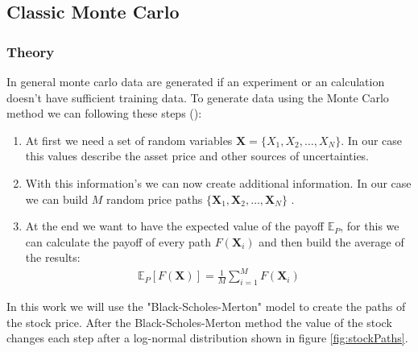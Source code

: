 \subsection{Classic Monte Carlo}
\subsubsection{Theory} \label{sec:classic_mc_theory}
In general monte carlo data are generated if an experiment or an calculation doesn't have sufficient training data. To generate data using the Monte Carlo method we can following these steps (\cite{1905.02666}):
\begin{enumerate}
	\item At first we need a set of random variables $\textbf{X}=\{X_1, X_2, \dots, X_N\}$. In our case this values describe the asset price and other sources of uncertainties.
	\item With this information's we can now create additional information. In our case we can build $M$ random price paths $\{ \textbf{X}_1, \textbf{X}_2, \dots, \textbf{X}_N \}$ .
	\item At the end we want to have the expected value of the payoff $\mathbb{E}_P$, for this we can calculate the payoff of every path $F(\textbf{X}_i)$ and then build the average of the results:
	    \begin{align}
	        \mathbb{E}_P[F(\textbf{X})] = \frac{1}{M} \sum_{i=1}^{M} F(\textbf{X}_i)
	    \end{align}
\end{enumerate}

In this work we will use the "Black-Scholes-Merton" model to create the paths of the stock price. After the Black-Scholes-Merton method the value of the stock changes each step after a log-normal distribution shown in figure \ref{fig:stockPaths}.

